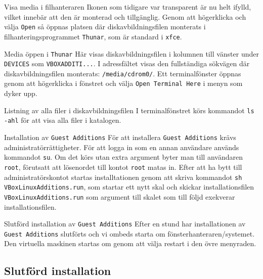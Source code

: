            {Visa media i filhanteraren}
           {Ikonen som tidigare var transparent är nu helt ifylld, vilket
            innebär att den är monterad och tillgänglig. Genom att högerklicka
            och välja \texttt{Open} så öppnas platsen där diskavbildningsfilen
            monterats i filhanteringsprogrammet \texttt{Thunar}, som är 
            standard i \texttt{xfce}.}
           {}

           {Media öppen i \texttt{Thunar}}
           {Här visas diskavbildningsfilen i kolumnen till vänster under
            \texttt{DEVICES} som \texttt{VBOXADDITI...}. I adressfältet visas
            den fullständiga sökvägen där diskavbildningsfilen monterats:
            \texttt{/media/cdrom0/}. Ett terminalfönster öppnas genom att
            högerklicka i fönstret och välja \texttt{Open Terminal Here} i
            menyn som dyker upp.}
           {}

           {Listning av alla filer i diskavbildningsfilen}
           {I terminalfönstret körs kommandot \texttt{ls -ahl} för att visa
            alla filer i katalogen.}
           {}

           {Installation av \texttt{Guest Additions}}
           {För att installera \texttt{Guest Additions} krävs
            administratörrättigheter. För att logga in som en annan användare
            används kommandot \texttt{su}. Om det körs utan extra argument 
            byter man till användaren \texttt{root}, förutsatt att lösenordet
            till kontot \texttt{root} matas in. Efter att ha bytt till
            administratörskontot startas installtationen genom att skriva
            kommandot \texttt{sh VBoxLinuxAdditions.run}, som startar ett nytt
            skal och skickar installationsfilen \texttt{VBoxLinuxAdditions.run}
            som argument till skalet som till följd exekverar installationsfilen.}
           {}

           {Slutförd installation av \texttt{Guest Additions}}
           {Efter en stund har installationen av \texttt{Guest Additions}
            slutförts och vi ombeds starta om fönsterhanteraren/systemet.
            Den virtuella maskinen startas om genom att välja restart i 
            den övre menyraden.}
           {}


\subsection{Slutförd installation}

